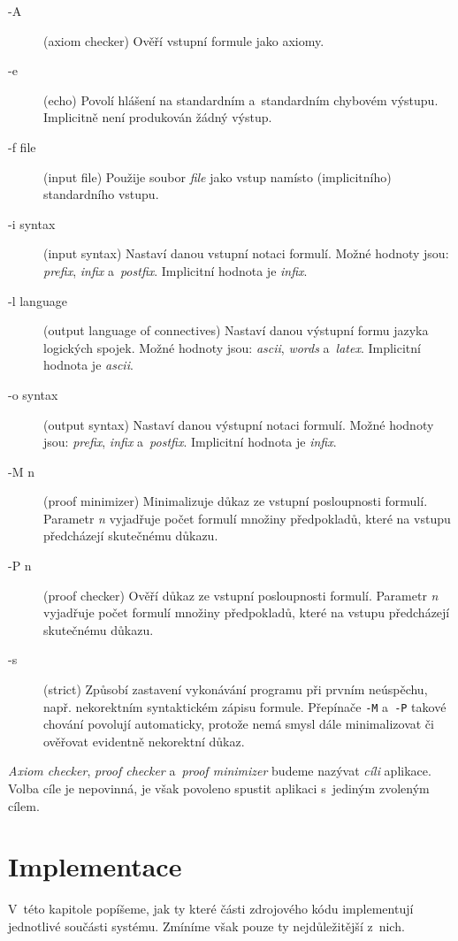 \documentclass[thesis=B,czech,hidelinks]{thesis}[2012/06/26]
\begin{document}
\begin{description}
	\item[-A] (axiom checker) Ověří vstupní formule jako axiomy.
	\item[-e] (echo) Povolí hlášení na standardním a~standardním chybovém výstupu. Implicitně není produkován žádný výstup.
	\item[-f file] (input file) Použije soubor \emph{file} jako vstup namísto (implicitního) standardního vstupu.
	\item[-i syntax] (input syntax) Nastaví danou vstupní notaci formulí. Možné hodnoty jsou: \emph{prefix}, \emph{infix} a~\emph{postfix}. Implicitní hodnota je \emph{infix}.
	\item[-l language] (output language of connectives) Nastaví danou výstupní formu jazyka logických spojek. Možné hodnoty jsou: \emph{ascii}, \emph{words} a~\emph{latex}. Implicitní hodnota je \emph{ascii}.
	\item[-o syntax] (output syntax) Nastaví danou výstupní notaci formulí. Možné hodnoty jsou: \emph{prefix}, \emph{infix} a~\emph{postfix}. Implicitní hodnota je \emph{infix}.
	\item[-M n] (proof minimizer) Minimalizuje důkaz ze vstupní posloupnosti formulí. Parametr \emph{n} vyjadřuje počet formulí množiny předpokladů, které na vstupu předcházejí skutečnému důkazu.
	\item[-P n] (proof checker) Ověří důkaz ze vstupní posloupnosti formulí. Parametr \emph{n} vyjadřuje počet formulí množiny předpokladů, které na vstupu předcházejí skutečnému důkazu.
	\item[-s] (strict) Způsobí zastavení vykonávání programu při prvním neúspěchu, např. nekorektním syntaktickém zápisu formule. Přepínače \texttt{-M} a~\texttt{-P} takové chování povolují automaticky, protože nemá smysl dále minimalizovat či ověřovat evidentně nekorektní důkaz.
\end{description}

\emph{Axiom checker}, \emph{proof checker} a~\emph{proof minimizer} budeme nazývat \emph{cíli} aplikace. Volba cíle je nepovinná, je však povoleno spustit aplikaci s~jediným zvoleným cílem.

%
%
%

\chapter{Implementace}

V~této kapitole popíšeme, jak ty které části zdrojového kódu implementují jednotlivé součásti systému. Zmíníme však pouze ty nejdůležitější z~nich.
\end{document}
